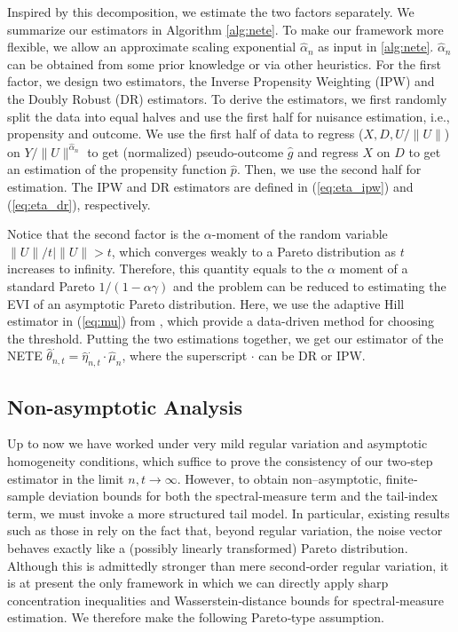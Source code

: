 \documentclass[12pt]{article}
\theoremstyle{plain}
\theoremstyle{definition}
\begin{document}
Inspired by this decomposition, we estimate the two factors separately. We summarize our estimators in Algorithm \ref{alg:nete}. To make our framework more flexible, we allow an approximate scaling exponential $\hat{\alpha}_n$ as input in \cref{alg:nete}. $\hat{\alpha}_n$ can be obtained from some prior knowledge or via other heuristics. For the first factor, we design two estimators, the Inverse Propensity Weighting (IPW) and the Doubly Robust (DR) estimators. To derive the estimators, we first randomly split the data into equal halves and use the first half for nuisance estimation, i.e., propensity and outcome. We use the first half of data to regress ($X, D, U /\|U\|$) on $Y/\|U\|^{\hat{\alpha}_n}$ to get (normalized) pseudo-outcome $\hat{g}$ and regress $X$ on $D$ to get an estimation of the propensity function $\hat{p}$. Then, we use
the second half for estimation. The IPW and DR estimators are defined in (\ref{eq:eta_ipw}) and (\ref{eq:eta_dr}), respectively.  


Notice that the second factor is the $\alpha$-moment of the random variable $\|U\|/ t \mid \|U\|> t$, which converges weakly to a Pareto distribution as $t$ increases to infinity. Therefore, this quantity equals to the $\alpha$ moment of a standard Pareto $ 1/(1-\alpha \gamma) $ and the problem can be reduced to estimating the EVI of an asymptotic Pareto distribution. Here, we use the adaptive Hill estimator in (\ref{eq:mu}) from {\cite{boucheron2015tail}}, which provide a data-driven method for choosing the threshold.  Putting the two estimations together, we get our estimator of the NETE $\hat{\theta}_{n, t}^{\cdot} = \hat{\eta}_{n, t}^{\cdot}
\cdot \hat{\mu}_n$, where the superscript ${\cdot}$ can be DR or IPW.


\subsection{Non-asymptotic Analysis}

Up to now we have worked under very
mild regular variation and asymptotic homogeneity conditions, which suffice to prove the consistency of our two‐step estimator in the limit $n, t \rightarrow
\infty$. However, to obtain non--asymptotic, finite‐sample deviation bounds for both the spectral‐measure term and the tail‐index term, we must invoke a more structured tail model.  In particular, existing results such as those in {\cite{zhang2023wasserstein}} rely on the fact that, beyond regular variation, the noise vector behaves exactly like a (possibly linearly transformed) Pareto distribution. Although this is admittedly stronger than
mere second‐order regular variation, it is at present the only framework in which we can directly apply sharp concentration inequalities and Wasserstein‐distance bounds for spectral‐measure estimation. We therefore make the following Pareto‐type assumption.
\end{document}
